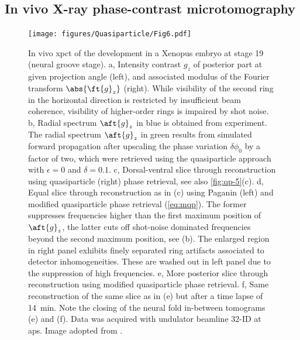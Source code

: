 \documentclass[
twoside,
openright,
titlepage,
numbers=noenddot,
headinclude,
fleqn,
a4paper,
footinclude=true,
cleardoublepage=empty,
abstractoff,
BCOR=5mm,
paper=a4,
fontsize=11pt,
british,ngerman,american,
]{scrreprt}
\begin{document}
\subsection[\texorpdfstring{In vivo X-ray phase-contrast\\
  microtomography}{In vivo X-ray phase-contrast microtomography}]{In
  vivo X-ray phase-contrast microtomography}
\label{sec:qp-tomo-invivo}

\begin{figure}
  \centering
  \texttt{[image: figures/Quasiparticle/Fig6.pdf]}
  \caption[In vivo \ac{xpct} of Xenopus development within stage-19
  embryo.]{In vivo \ac{xpct} of the development in a Xenopus embryo at
    stage 19 (neural groove stage).  a, Intensity contrast $g_z$ of
    posterior part at given projection angle (left), and associated
    modulus of the Fourier transform $\abs{\ft{g}_z}$ (right).  While
    visibility of the second ring in the horizontal direction is
    restricted by insufficient beam coherence, visibility of
    higher-order rings is impaired by shot noise.  b, Radial spectrum
    $\aft{g}_z$ in blue is obtained from experiment.  The radial
    spectrum $\aft{g}_z$ in green results from simulated forward
    propagation after upscaling the phase variation $\delta\phi_0$ by
    a factor of two, which were retrieved using the quasiparticle
    approach with $\epsilon=0$ and $\delta=\num{0.1}$.  c,
    Dorsal-ventral slice through reconstruction using quasiparticle
    (right) phase retrieval, see also \cref{fig:qp-5}(c).  d, Equal
    slice through reconstruction as in (c) using Paganin (left) and
    modified quasiparticle phase retrieval (\cref{eq:mqp}).  The
    former suppresses frequencies higher than the first maximum
    position of $\aft{g}_z$, the latter cuts off shot-noise dominated
    frequencies beyond the second maximum position, see (b).  The
    enlarged region in right panel exhibits finely separated ring
    artifacts associated to detector inhomogeneities.  These are
    washed out in left panel due to the suppression of high
    frequencies.  e, More posterior slice through reconstruction using
    modified quasiparticle phase retrieval.  f, Same reconstruction of
    the same slice as in (e) but after a time lapse of \SI{14}{min}.
    Note the closing of the neural fold in-between tomograms (e) and
    (f).  Data was acquired with undulator beamline 32-ID at \ac{aps}.
    Image adopted from \cite{Hofmann2014}.}
  \label{fig:qp-6}
\end{figure}
\end{document}
